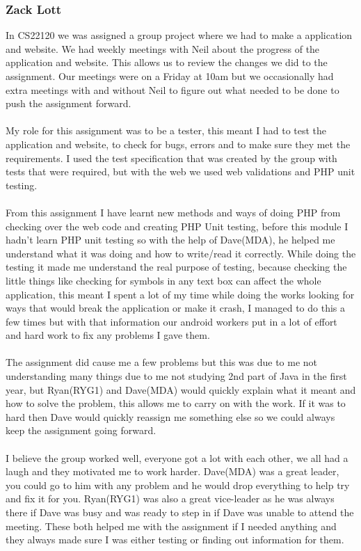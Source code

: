 \documentclass[12pt]{article}
\begin{document}
\subsubsection{Zack Lott}
In CS22120 we was assigned a group project where we had to make a application and website.
We had weekly meetings with Neil about the progress of the application and website. This allows us to review the changes we did to the assignment. Our meetings were on a Friday at 10am but we occasionally had extra meetings with and without Neil to figure out what needed to be done to push the assignment forward. 
~\\\\
My role for this assignment was to be a tester, this meant I had to test the application and website, to check for bugs, errors and to make sure they met the requirements. I used the test specification that was created by the group with tests that were required, but with the web we used web validations and PHP unit testing.
~\\\\
From this assignment I have learnt new methods and ways of doing PHP from checking over the web code and creating PHP Unit testing, before this module I hadn't learn PHP unit testing so with the help of Dave(MDA), he helped me understand what it was doing and how to write/read it correctly. While doing the testing it made me understand the real purpose of testing, because checking the little things like checking for symbols in any text box can affect the whole application, this meant I spent a lot of my time while doing the works looking for ways that would break the application or make it crash, I managed to do this a few times but with that information our android workers put in a lot of effort and hard work to fix any problems I gave them.
~\\\\
The assignment did cause me a few problems but this was due to me not understanding many things due to me not studying 2nd part of Java in the first year, but Ryan(RYG1) and Dave(MDA) would quickly explain what it meant and how to solve the problem, this allows me to carry on with the work. If it was to hard then Dave would quickly reassign me something else so we could always keep the assignment going forward.  
~\\\\
I believe the group worked well, everyone got a lot with each other, we all had a laugh and they motivated me to work harder. Dave(MDA) was a great leader, you could go to him with any problem and he would drop everything to help try and fix it for you. Ryan(RYG1) was also a great vice-leader as he was always there if Dave was busy and was ready to step in if Dave was unable to attend the meeting. These both helped me with the assignment if I needed anything and they always made sure I was either testing or finding out information for them. 
\end{document}
